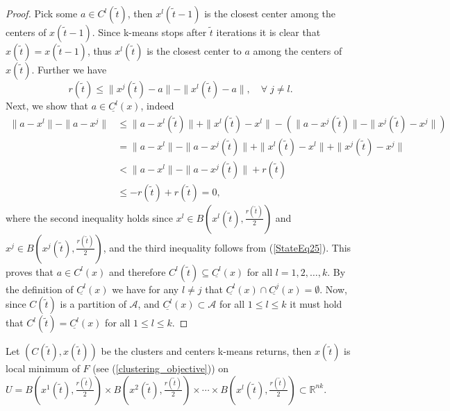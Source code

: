 \begin{proof}
Pick some $a \in C^l(\widetilde{t})$, then $x^l(\widetilde{t}-1)$ is the closest center among the centers of $x(\widetilde{t}-1)$. Since k-means stops after $\widetilde{t}$ iterations it is clear that $x(\widetilde{t})=x(\widetilde{t}-1)$, thus $x^l(\widetilde{t})$ is the closest center to $a$ among the centers of $x(\widetilde{t})$. Further we have
\begin{equation}
	r(\widetilde{t}) \leq \|x^j(\widetilde{t}) - a\| - \|x^l(\widetilde{t}) -a\|, \quad \forall \; j \neq l . \label{StateEq25}
\end{equation}
Next, we show that $a \in \underline{C^l}(x)$, indeed
\begin{align*}
	\|a - x^l\| -  \|a - x^j\| &\leq \|a - x^l(\widetilde{t})\| + \|x^l(\widetilde{t}) - x^l\| - \left( \|a - x^j(\widetilde{t})\| - \|x^j(\widetilde{t}) - x^j\| \right) \\
	& = \|a - x^l\| - \|a - x^j(\widetilde{t})\| + \|x^l(\widetilde{t}) - x^l\| + \|x^j(\widetilde{t}) - x^j\| \\
	& < \|a - x^l\| - \|a - x^j(\widetilde{t})\| + r(\widetilde{t}) \\
	& \leq -r(\widetilde{t}) + r(\widetilde{t}) = 0 ,
\end{align*}
where the second inequality holds since $x^l \in B\left( x^l(\widetilde{t}), \frac{r(\widetilde{t})}{2} \right)$ and $x^j \in B\left( x^j(\widetilde{t}), \frac{r(\widetilde{t})}{2} \right)$, and the third inequality follows from (\ref{StateEq25}). This proves that $a \in C^l(x)$ and therefore $C^l(\widetilde{t}) \subseteq \underline{C^l}(x)$ for all $l=1,2,\ldots,k$. 
By the definition of $\underline{C^l}(x)$ we have for any $l \neq j$ that $\underline{C^l}(x) \cap \underline{C^j}(x)=\emptyset$. Now, since $C(\widetilde{t})$ is a partition of $\mathcal{A}$, and $\underline{C^l}(x) \subset \mathcal{A}$ for all $1 \leq l \leq k$ it must hold that $C^l(\widetilde{t}) = \underline{C^l}(x)$ for all $1 \leq l \leq k$.
\end{proof}

\begin{proposition}
Let $\left(C(\widetilde{t}), x(\widetilde{t})\right)$ be the clusters and centers k-means returns, then $x(\widetilde{t})$ is local minimum of $F$ (see (\ref{clustering_objective})) on $U = B\left( x^1(\widetilde{t}),\frac{r(\widetilde{t})}{2}\right) \times  B\left( x^2(\widetilde{t}),\frac{r(\widetilde{t})}{2}\right) \times \cdots \times B\left( x^l(\widetilde{t}),\frac{r(\widetilde{t})}{2} \right) \subset \mathbb{R}^{nk}$.
\end{proposition}

